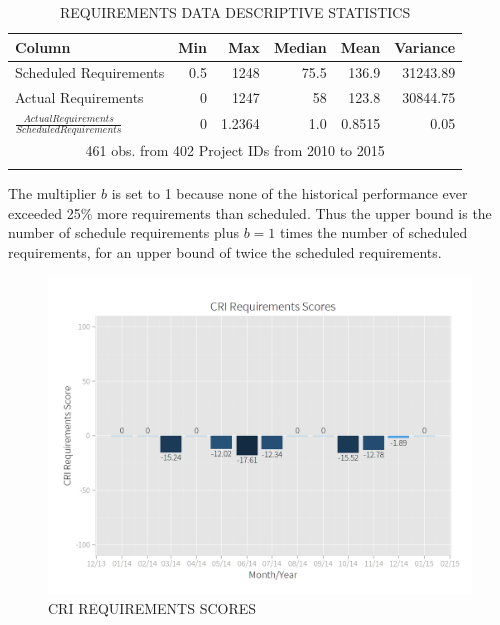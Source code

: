 \documentclass[SDSUThesis.tex]{subfiles}
\begin{document}
        \begin{longtable}{@{}l rr rrr}
            \toprule%
             \centering%
             {\bfseries Column}
             & {\bfseries Min}
             & {\bfseries Max}
             & {\bfseries Median}
             & {\bfseries Mean}
             & {\bfseries Variance} \\
            
            \cmidrule[0.2pt](r{0.125em}){1-1}%
            \cmidrule[0.2pt](lr{0.125em}){2-2}%
            \cmidrule[0.2pt](l{0.125em}){3-3}%
            \cmidrule[0.2pt](l{0.125em}){4-4}%
            \cmidrule[0.2pt](l{0.125em}){5-5}%
            \endhead
            
            Scheduled Requirements & 0.5 & 1248 & 75.5 & 136.9 & 31243.89 \\
            \myrowcolour%
            Actual Requirements & 0 & 1247 & 58 & 123.8 & 30844.75 \\
            $\frac{Actual Requirements}{Scheduled Requirements}$ & 0 & 1.2364 & 1.0 & 0.8515 & 0.05 \\
            
            \bottomrule
            
            \multicolumn{6}{c}{461 obs. from 402 Project IDs from 2010 to 2015} \\
            
            \caption{REQUIREMENTS DATA DESCRIPTIVE STATISTICS}
            \label{tab:requirements_desc}
        \end{longtable}
        
        The multiplier $b$ is set to 1 because none of the historical performance
        ever exceeded 25\% more requirements than scheduled. Thus the upper
        bound is the number of schedule requirements plus $b=1$ times
        the number of scheduled requirements, for an upper bound of twice
        the scheduled requirements.
        
        \begin{figure}[ht]
            \centering
            \includegraphics[scale=.3]{images/requirements_scores.png}
            \caption{CRI REQUIREMENTS SCORES}
            \label{fig:requirements-scores}
        \end{figure}
        
\end{document}
